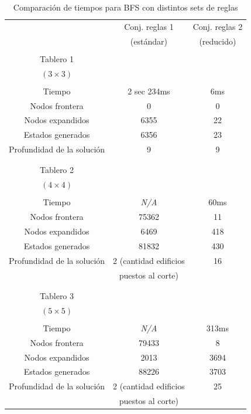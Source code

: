 \documentclass[%
	final,
	reprint,
	notitlepage,
	narroweqnarray,
	inline,
	twoside,
	invited
	]{ieee}
\begin{document}
\begin{table}[H]
\begin{center}
\begin{tabular}{|c|c|c|}
\hline
 & Conj. reglas 1 &  Conj. reglas 2\\
 & (estándar) &  (reducido)\\

\hline
\hline

&&\\
Tablero 1 & & \\
$(3\times 3)$ & & \\
&&\\
\hline
Tiempo & 2 sec 234ms & 6ms \\
\hline
Nodos frontera & 0 & 0 \\
\hline
Nodos expandidos & 6355 & 22 \\
\hline
Estados generados & 6356 & 23 \\
\hline
Profundidad de la solución & 9 & 9 \\
\hline
&&\\

\hline
\hline

&&\\
Tablero 2 & & \\
$(4\times 4)$ & & \\
&&\\
\hline
Tiempo & \textit{N/A} & 60ms \\
\hline
Nodos frontera & 75362 & 11 \\
\hline
Nodos expandidos & 6469 & 418 \\
\hline
Estados generados & 81832 & 430 \\
\hline
Profundidad de la solución & 2 (cantidad edificios  & 16 \\
&puestos al corte)&\\
\hline
&&\\

\hline
\hline

&&\\
Tablero 3 & & \\
$(5\times 5)$ & & \\
&&\\
\hline
Tiempo & \textit{N/A} & 313ms \\
\hline
Nodos frontera & 79433 & 8 \\
\hline
Nodos expandidos & 2013 & 3694 \\
\hline
Estados generados & 88226 & 3703 \\
\hline
Profundidad de la solución & 2 (cantidad edificios  & 25 \\
&puestos al corte)&\\

\hline  
\end{tabular}
\end{center}
\caption{Comparación de tiempos para BFS con distintos sets de reglas}\
\end{table}
\end{document}
